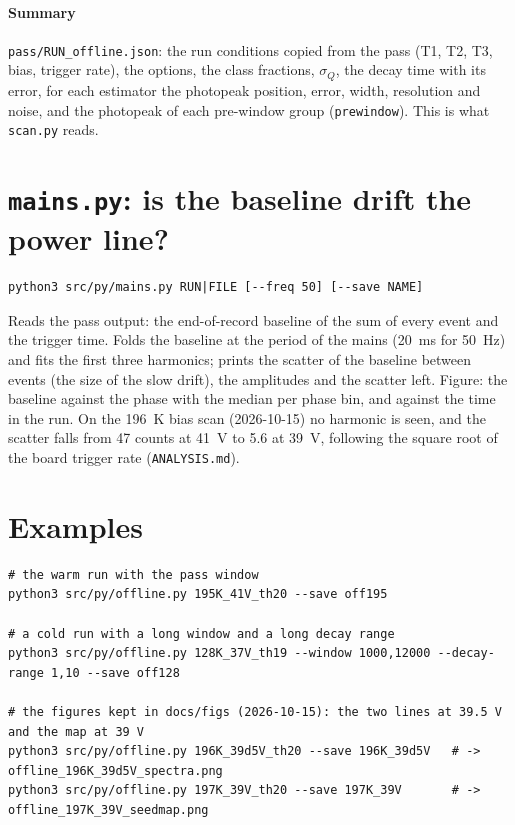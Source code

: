 \documentclass[11pt]{article}
\newcommand{\code}[1]{\texttt{#1}}
\begin{document}
\paragraph{Summary} \code{pass/RUN\_offline.json}: the run conditions
copied from the pass (T1, T2, T3, bias, trigger rate), the options, the
class fractions, $\sigma_Q$, the decay time with its error, for each
estimator the photopeak position, error, width, resolution and noise, and
the photopeak of each pre-window group (\code{prewindow}). This is what
\code{scan.py} reads.

\section{\code{mains.py}: is the baseline drift the power line?}

\begin{lstlisting}
python3 src/py/mains.py RUN|FILE [--freq 50] [--save NAME]
\end{lstlisting}
Reads the pass output: the end-of-record baseline of the sum of every
event and the trigger time. Folds the baseline at the period of the
mains (20~ms for 50~Hz) and fits the first three harmonics; prints the
scatter of the baseline between events (the size of the slow drift), the
amplitudes and the scatter left. Figure: the baseline against the phase
with the median per phase bin, and against the time in the run. On the
196~K bias scan (2026-10-15) no harmonic is seen, and the scatter falls
from 47 counts at 41~V to 5.6 at 39~V, following the square root of the
board trigger rate (\code{ANALYSIS.md}).

\section{Examples}

\begin{lstlisting}
# the warm run with the pass window
python3 src/py/offline.py 195K_41V_th20 --save off195

# a cold run with a long window and a long decay range
python3 src/py/offline.py 128K_37V_th19 --window 1000,12000 --decay-range 1,10 --save off128

# the figures kept in docs/figs (2026-10-15): the two lines at 39.5 V and the map at 39 V
python3 src/py/offline.py 196K_39d5V_th20 --save 196K_39d5V   # -> offline_196K_39d5V_spectra.png
python3 src/py/offline.py 197K_39V_th20 --save 197K_39V       # -> offline_197K_39V_seedmap.png
\end{lstlisting}
\end{document}
